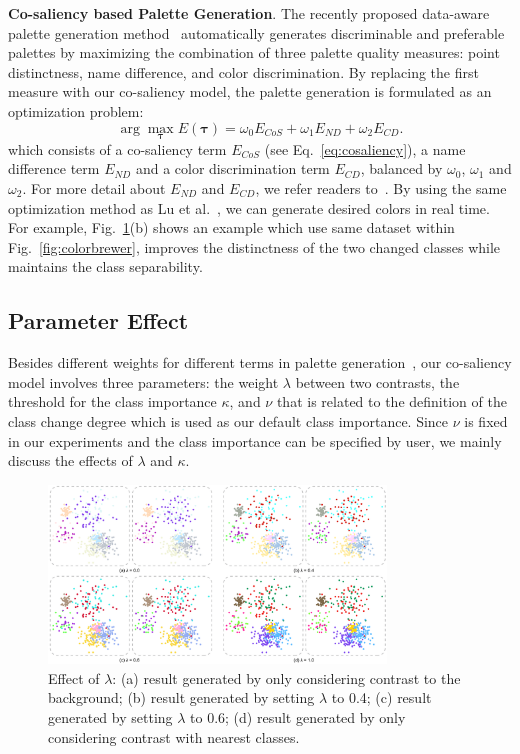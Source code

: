 \vspace{1.5mm}
\noindent\textbf{Co-saliency based Palette Generation}.
The recently proposed data-aware palette generation method~\cite{Lu21} automatically generates discriminable and preferable palettes by maximizing the combination of three palette quality measures: point distinctness, name difference, and color discrimination.
By replacing the first measure with our co-saliency model, the palette generation is formulated as an optimization problem:
\begin{equation}
\arg\max_{\mathbf{\tau}} E(\mathbf{\tau}) = \omega_0 E_{CoS} + \omega_1 E_{ND} + \omega_2 E_{CD}.
\label{eq:energyfunc}
\end{equation}
which consists of a co-saliency term $E_{CoS}$ (see Eq.~\ref{eq:cosaliency}), a name difference term $E_{ND}$ and a color discrimination term $E_{CD}$, balanced by $\omega_0$, $\omega_1$ and $\omega_2$. For more detail about $E_{ND}$ and $E_{CD}$, we refer readers to~\cite{Lu21}. By using the same optimization method as Lu et al.~\cite{Lu21}, we can generate desired colors in real time. %
For example, Fig.~\ref{fig:lambda}(b) shows an example which use same dataset within Fig.~\ref{fig:colorbrewer}, improves the distinctness of the two changed classes while maintains the class separability.



\subsection{Parameter Effect}
\label{subsec:parameter}
Besides different weights for different terms in palette generation~\cite{Lu21}, our co-saliency model involves three parameters: the weight $\lambda$ between two contrasts, the threshold for the class importance $\kappa$, and $\nu$ that is related to the definition of the class change degree which is used as our default class importance.
Since $\nu$ is fixed in our experiments and the class importance can be specified by user, we mainly discuss the effects of $\lambda$  and $\kappa$.

\begin{figure}[h]
\centering
\includegraphics[width=0.8\textwidth]{figures/lambda.pdf}
\caption{Effect of $\lambda$: (a) result generated by only considering contrast to the background; (b) result generated by setting $\lambda$ to 0.4; (c) result generated by setting $\lambda$ to 0.6; (d) result generated by only considering contrast with nearest classes.}
\vspace*{-3mm}
\label{fig:lambda}
\end{figure}


